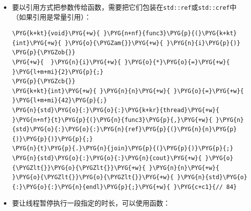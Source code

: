 \begin{itemize}

\begin{codeblockbg}
\begin{Verbatim}[commandchars=\\\{\},breaklines=true,breakanywhere=true,fontsize=\codefont,xleftmargin=17bp]
\PYG{n}{t}\PYG{p}{.}\PYG{n}{detach}\PYG{p}{(}\PYG{p}{)}\PYG{p}{;}
\end{Verbatim}
\end{codeblockbg}



\item 要以引用方式把参数传给函数，需要把它们包装在\texttt{std::\allowbreak{}ref}或\texttt{std::\allowbreak{}cref}中（如果引用是常量引用）：



\begin{codeblockbg}
\begin{Verbatim}[commandchars=\\\{\},breaklines=true,breakanywhere=true,fontsize=\codefont,xleftmargin=17bp]
\PYG{k+kt}{void}\PYG{+w}{ }\PYG{n+nf}{func3}\PYG{p}{(}\PYG{k+kt}{int}\PYG{+w}{ }\PYG{o}{\PYGZam{}}\PYG{+w}{ }\PYG{n}{i}\PYG{p}{)}
\PYG{p}{\PYGZob{}}
\PYG{+w}{  }\PYG{n}{i}\PYG{+w}{ }\PYG{o}{*}\PYG{o}{=}\PYG{+w}{ }\PYG{l+m+mi}{2}\PYG{p}{;}
\PYG{p}{\PYGZcb{}}
\PYG{k+kt}{int}\PYG{+w}{ }\PYG{n}{n}\PYG{+w}{ }\PYG{o}{=}\PYG{+w}{ }\PYG{l+m+mi}{42}\PYG{p}{;}
\PYG{n}{std}\PYG{o}{:}\PYG{o}{:}\PYG{k+kr}{thread}\PYG{+w}{ }\PYG{n+nf}{t}\PYG{p}{(}\PYG{n}{func3}\PYG{p}{,}\PYG{+w}{ }\PYG{n}{std}\PYG{o}{:}\PYG{o}{:}\PYG{n}{ref}\PYG{p}{(}\PYG{n}{n}\PYG{p}{)}\PYG{p}{)}\PYG{p}{;}
\PYG{n}{t}\PYG{p}{.}\PYG{n}{join}\PYG{p}{(}\PYG{p}{)}\PYG{p}{;}
\PYG{n}{std}\PYG{o}{:}\PYG{o}{:}\PYG{n}{cout}\PYG{+w}{ }\PYG{o}{\PYGZlt{}}\PYG{o}{\PYGZlt{}}\PYG{+w}{ }\PYG{n}{n}\PYG{+w}{ }\PYG{o}{\PYGZlt{}}\PYG{o}{\PYGZlt{}}\PYG{+w}{ }\PYG{n}{std}\PYG{o}{:}\PYG{o}{:}\PYG{n}{endl}\PYG{p}{;}\PYG{+w}{ }\PYG{c+c1}{// 84}
\end{Verbatim}
\end{codeblockbg}



\item 要让线程暂停执行一段指定的时长，可以使用函数：




\end{itemize}
